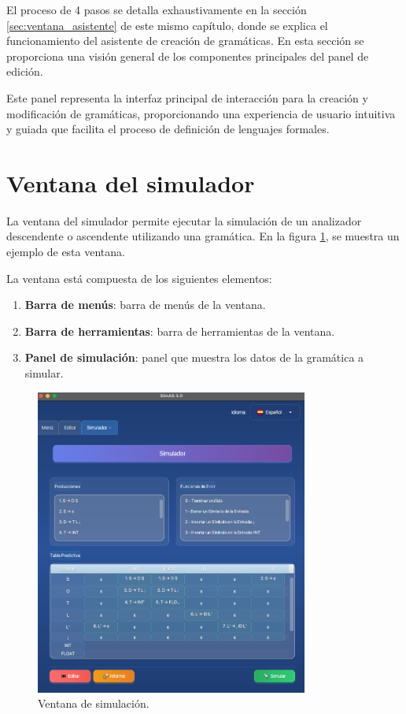 El proceso de 4 pasos se detalla exhaustivamente en la sección \ref{sec:ventana_asistente} de este mismo capítulo, donde se explica el funcionamiento del asistente de creación de gramáticas. En esta sección se proporciona una visión general de los componentes principales del panel de edición.

Este panel representa la interfaz principal de interacción para la creación y modificación de gramáticas, proporcionando una experiencia de usuario intuitiva y guiada que facilita el proceso de definición de lenguajes formales.

\section{Ventana del simulador}

La ventana del simulador permite ejecutar la simulación de un analizador descendente o ascendente utilizando una gramática. En la figura \ref{fig:d5}, se muestra un ejemplo de esta ventana.

La ventana está compuesta de los siguientes elementos:
\begin{enumerate}
 \item \textbf{Barra de menús}: barra de menús de la ventana.
 \item \textbf{Barra de herramientas}: barra de herramientas de la ventana.
 \item \textbf{Panel de simulación}: panel que muestra los datos de la gramática a simular.
\end{enumerate}

\begin{figure}[htp]
\centering
	\includegraphics[width=0.8\textwidth]{figuras2/ejemplo_practico/simulador.png}
	\caption{Ventana de simulación.}
	\label{fig:d5}
\end{figure}

